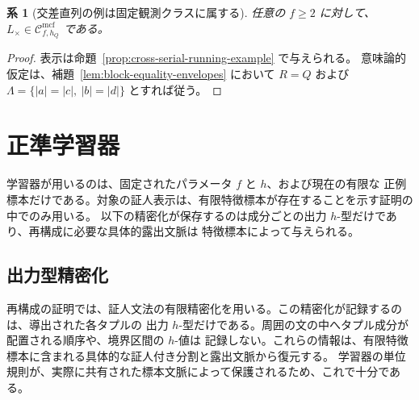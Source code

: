 \documentclass[11pt,a4paper]{ltjsarticle}
\newtheorem{corollary}[theorem]{系}
\theoremstyle{remark}
\newcommand{\Cmcf}[2]{\mathcal{C}^{\mathrm{mcf}}_{#1,#2}}
\begin{document}
\begin{corollary}[交差直列の例は固定観測クラスに属する]
\label{cor:cross-serial-in-fixed-observation-class}
任意の \(f\ge2\) に対して、\(L_{\times}\in\Cmcf{f}{h_Q}\) である。
\end{corollary}

\begin{proof}
表示は命題~\ref{prop:cross-serial-running-example} で与えられる。
意味論的仮定は、補題~\ref{lem:block-equality-envelopes} において
\(R=Q\) および \(\Lambda=\{|a|=|c|,\ |b|=|d|\}\) とすれば従う。
\end{proof}

\section{正準学習器}
\label{sec:learner}

学習器が用いるのは、固定されたパラメータ \(f\) と \(h\)、および現在の有限な
正例標本だけである。対象の証人表示は、有限特徴標本が存在することを示す証明の中でのみ用いる。
以下の精密化が保存するのは成分ごとの出力 \(h\)-型だけであり、再構成に必要な具体的露出文脈は
特徴標本によって与えられる。

\subsection{出力型精密化}
\label{sec:refinement}

再構成の証明では、証人文法の有限精密化を用いる。この精密化が記録するのは、導出された各タプルの
出力 \(h\)-型だけである。周囲の文の中へタプル成分が配置される順序や、境界区間の \(h\)-値は
記録しない。これらの情報は、有限特徴標本に含まれる具体的な証人付き分割と露出文脈から復元する。
学習器の単位規則が、実際に共有された標本文脈によって保護されるため、これで十分である。
\end{document}
